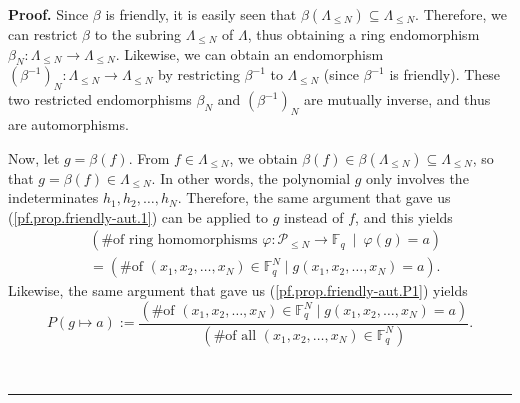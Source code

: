 \documentclass[numbers=enddot,12pt,final,onecolumn,notitlepage]{scrartcl}%
\theoremstyle{definition}
\newenvironment{proof}[1][Proof]{\noindent\textbf{#1.} }{\ \rule{0.5em}{0.5em}}
\renewcommand{\leq}{\leqslant}
\theoremstyle{plainsl}
\begin{document}
\begin{proof}
Since $\beta$ is friendly, it is easily seen that $\beta\left(  \Lambda_{\leq
N}\right)  \subseteq\Lambda_{\leq N}$. Therefore, we can restrict $\beta$ to
the subring $\Lambda_{\leq N}$ of $\Lambda$, thus obtaining a ring
endomorphism $\beta_{N}:\Lambda_{\leq N}\rightarrow\Lambda_{\leq N}$.
Likewise, we can obtain an endomorphism $\left(  \beta^{-1}\right)
_{N}:\Lambda_{\leq N}\rightarrow\Lambda_{\leq N}$ by restricting $\beta^{-1}$
to $\Lambda_{\leq N}$ (since $\beta^{-1}$ is friendly). These two restricted
endomorphisms $\beta_{N}$ and $\left(  \beta^{-1}\right)  _{N}$ are mutually
inverse, and thus are automorphisms.

Now, let $g=\beta\left(  f\right)  $. From $f\in\Lambda_{\leq N}$, we obtain
$\beta\left(  f\right)  \in\beta\left(  \Lambda_{\leq N}\right)
\subseteq\Lambda_{\leq N}$, so that $g=\beta\left(  f\right)  \in\Lambda_{\leq
N}$. In other words, the polynomial $g$ only involves the indeterminates
$h_{1},h_{2},\ldots,h_{N}$. Therefore, the same argument that gave us
(\ref{pf.prop.friendly-aut.1}) can be applied to $g$ instead of $f$, and this
yields%
\begin{align}
& \left(  \text{\# of ring homomorphisms }\varphi:\mathcal{P}_{\leq
N}\rightarrow\mathbb{F}_{q}\ \mid\ \varphi\left(  g\right)  =a\right)
\nonumber\\
& =\left(  \text{\# of }\left(  x_{1},x_{2},\ldots,x_{N}\right)  \in
\mathbb{F}_{q}^{N}\mid g\left(  x_{1},x_{2},\ldots,x_{N}\right)  =a\right)
.\label{pf.prop.friendly-aut.2}%
\end{align}
Likewise, the same argument that gave us (\ref{pf.prop.friendly-aut.P1})
yields%
\begin{equation}
P\left(  g\mapsto a\right)  :=\dfrac{\left(  \text{\# of }\left(  x_{1}%
,x_{2},\ldots,x_{N}\right)  \in\mathbb{F}_{q}^{N}\mid g\left(  x_{1}%
,x_{2},\ldots,x_{N}\right)  =a\right)  }{\left(  \text{\# of all }\left(
x_{1},x_{2},\ldots,x_{N}\right)  \in\mathbb{F}_{q}^{N}\right)  }%
.\label{pf.prop.friendly-aut.P2}%
\end{equation}



\end{proof}
\end{document}
